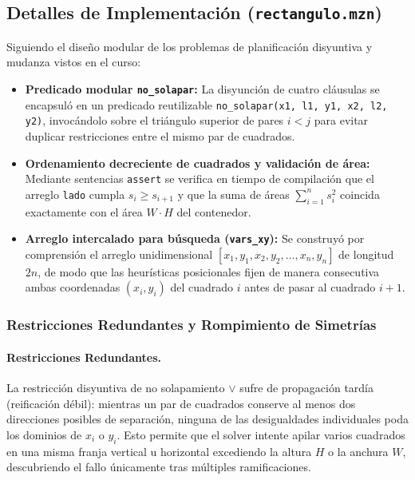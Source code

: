 \subsection{Detalles de Implementación (\texttt{rectangulo.mzn})}
Siguiendo el diseño modular de los problemas de planificación disyuntiva y mudanza vistos en el curso:
\begin{itemize}
    \item \textbf{Predicado modular \texttt{no\_solapar}:} La disyunción de cuatro cláusulas se encapsuló en un predicado reutilizable \texttt{no\_solapar(x1, l1, y1, x2, l2, y2)}, invocándolo sobre el triángulo superior de pares $i < j$ para evitar duplicar restricciones entre el mismo par de cuadrados.
    \item \textbf{Ordenamiento decreciente de cuadrados y validación de área:} Mediante sentencias \texttt{assert} se verifica en tiempo de compilación que el arreglo \texttt{lado} cumpla $s_i \ge s_{i+1}$ y que la suma de áreas $\sum_{i=1}^n s_i^2$ coincida exactamente con el área $W \cdot H$ del contenedor.
    \item \textbf{Arreglo intercalado para búsqueda (\texttt{vars\_xy}):} Se construyó por comprensión el arreglo unidimensional $[x_1, y_1, x_2, y_2, \dots, x_n, y_n]$ de longitud $2n$, de modo que las heurísticas posicionales fijen de manera consecutiva ambas coordenadas $(x_i, y_i)$ del cuadrado $i$ antes de pasar al cuadrado $i+1$.
\end{itemize}

\subsubsection{Restricciones Redundantes y Rompimiento de Simetrías}

\paragraph{Restricciones Redundantes.}
La restricción disyuntiva de no solapamiento $\lor$ sufre de propagación tardía (reificación débil): mientras un par de cuadrados conserve al menos dos direcciones posibles de separación, ninguna de las desigualdades individuales poda los dominios de $x_i$ o $y_i$. Esto permite que el solver intente apilar varios cuadrados en una misma franja vertical u horizontal excediendo la altura $H$ o la anchura $W$, descubriendo el fallo únicamente tras múltiples ramificaciones.

